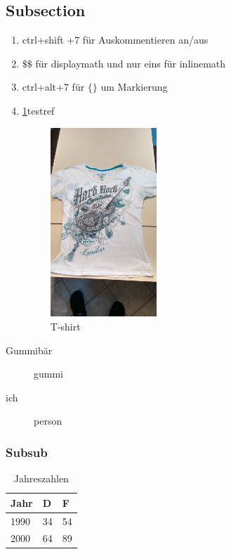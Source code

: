 \documentclass{scrartcl}
\begin{document}
\subsection{Subsection}
\begin{enumerate}
 \item
       ctrl+shift +7 für Auskommentieren an/aus
 \item
       \(\$\$\) für displaymath und nur eins für inlinemath
 \item
       ctrl+alt+7 für \(\{\}\) um Markierung
 \item
       \ref{tbl:einwohner}testref

       \begin{figure}
        \begin{center}
         \includegraphics[width=4cm]{testbild.jpg}
        \end{center}
        \caption{T-shirt}
        \label{fig: tshirt}
       \end{figure}



\end{enumerate}

\begin{description}
 \item[Gummibär] gummi
 \item[ich] person
\end{description}
\subsubsection{Subsub}
\begin{table}[h]
 \centering
 \begin{tabular}{l|ll}
  \textbf{Jahr} & \textbf{D} & \textbf{F}
  \\  \hline
  1990          & 34         & 54         \\
  2000          & 64         & 89
 \end{tabular}
 \caption{Jahreszahlen}
 \label{tbl:einwohner}
\end{table}
\end{document}
